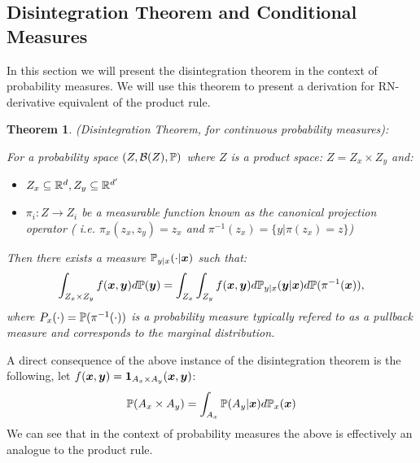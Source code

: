 \documentclass[a4paper,12pt,twoside,openright]{report}
\newtheorem{theorem}{Theorem}
\theoremstyle{definition}
\begin{document}
\subsection{Disintegration Theorem and Conditional Measures}

In this section we will present the disintegration theorem in the context of probability measures. We will use this theorem to present a derivation for RN-derivative equivalent of the product rule.

\begin{theorem} (Disintegration Theorem, for continuous probability measures): 

For a probability space $(Z, \calB(Z) ,\P)$ where $Z$ is a product space: $Z = Z_x \times Z_y$ and:
\begin{itemize}
    \item  $Z_x \subseteq \R^d, Z_y \subseteq \R^{d'}$
    \item  $\pi_i: Z \rightarrow Z_i$ be a measurable function known as the canonical projection operator ( i.e. $\pi_x(z_x,z_y) = z_x$ and $\pi^{-1}(z_x) = \{y | \pi(z_x) = z\}$)
\end{itemize}
Then there exists a measure $\P_{y|x}(\cdot | \vx)$ such that:
  \begin{align}
      \int_{Z_x \times Z_y} f(\vx, \vy) d\P(\vy) = \int_{Z_x}\int_{Z_y} f(\vx,\vy) d\P_{y|x}(\vy | \vx) d\P(\pi^{-1}(\vx)),
  \end{align}
 where $P_x(\cdot) = \P(\pi^{-1}(\cdot))$  is a probability measure typically refered to as a pullback measure and corresponds to the marginal distribution.
\end{theorem}

A direct consequence of the above instance of the disintegration theorem is the following, let $f(\vx,\vy) = \ind_{A_x \times A_y}(\vx,\vy)$:
\begin{align}
    \P(A_x \times A_y) = \int_{A_x}\P(A_y | \vx) d\P_x(\vx) 
\end{align}
 We can see that in the context of probability measures the above is effectively an analogue to the product rule.
\end{document}
